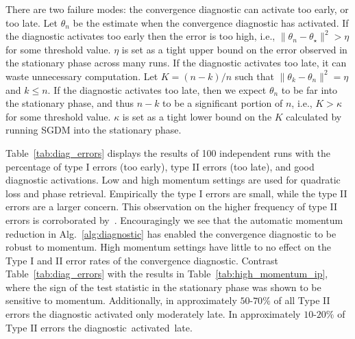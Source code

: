 \documentclass[conference]{IEEEtran}
\begin{document}
There are two failure modes: the convergence diagnostic can activate too early, or too late.
Let $\theta_n$ be the estimate when the convergence diagnostic has activated.
If the diagnostic activates too early then the error is too high, i.e., $\| \theta_n - \theta_\star \|^2 > \eta$ for some threshold value.
$\eta$ is set as a tight upper bound on the error observed in the stationary phase across many runs. 
If the diagnostic activates too late, it can waste unnecessary computation. Let $K = (n - k) / n$ such that $\| \theta_k - \theta_n \|^2 = \eta$ and $k \leq n$.
If the diagnostic activates too late, then we expect $\theta_n$ to be far into the stationary phase,  and thus $n-k$ to be a significant portion of  $n$, i.e., $K > \kappa$ for some threshold value. $\kappa$ is set as a tight lower bound on the $K$ calculated by running SGDM  into the stationary phase.

Table~\ref{tab:diag_errors} displays the results of 100 independent runs with the percentage of type I errors (too early), type II errors (too late), and good diagnostic activations.
Low and high momentum settings are used for quadratic loss and phase retrieval.
Empirically the type I errors are small, while the type II errors are a larger concern.
This observation on the higher frequency of type II errors is corroborated by~\cite{Proc:Chee_AISTATS18}. Encouragingly we see that the automatic momentum reduction in Alg.~\ref{alg:diagnostic} has enabled the convergence diagnostic to be robust to momentum.
High momentum settings have little to no effect on the Type I and II error rates of the convergence diagnostic.
Contrast Table~\ref{tab:diag_errors} with the results in Table~\ref{tab:high_momentum_ip}, where the sign of the test statistic in the stationary phase was shown to be sensitive to momentum. 
Additionally, in approximately $50$-$70\%$ of all Type II errors the diagnostic activated only moderately late. In approximately $10$-$20\%$ of Type II errors the diagnostic~activated~late.
\end{document}
